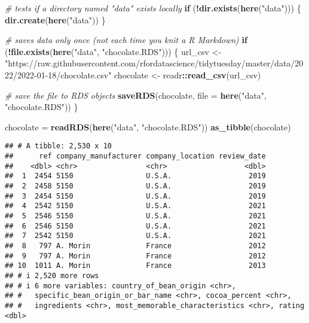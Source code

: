 \documentclass[
]{article}
\newenvironment{Shaded}{\begin{snugshade}}{\end{snugshade}}
\newcommand{\AttributeTok}[1]{\textcolor[rgb]{0.13,0.29,0.53}{#1}}
\newcommand{\CommentTok}[1]{\textcolor[rgb]{0.56,0.35,0.01}{\textit{#1}}}
\newcommand{\ControlFlowTok}[1]{\textcolor[rgb]{0.13,0.29,0.53}{\textbf{#1}}}
\newcommand{\FunctionTok}[1]{\textcolor[rgb]{0.13,0.29,0.53}{\textbf{#1}}}
\newcommand{\NormalTok}[1]{#1}
\newcommand{\OtherTok}[1]{\textcolor[rgb]{0.56,0.35,0.01}{#1}}
\newcommand{\SpecialCharTok}[1]{\textcolor[rgb]{0.81,0.36,0.00}{\textbf{#1}}}
\newcommand{\StringTok}[1]{\textcolor[rgb]{0.31,0.60,0.02}{#1}}
\begin{document}
\begin{Shaded}
\begin{Highlighting}[]
\CommentTok{\# tests if a directory named "data" exists locally}
\ControlFlowTok{if}\NormalTok{ (}\SpecialCharTok{!}\FunctionTok{dir.exists}\NormalTok{(}\FunctionTok{here}\NormalTok{(}\StringTok{"data"}\NormalTok{))) \{}
    \FunctionTok{dir.create}\NormalTok{(}\FunctionTok{here}\NormalTok{(}\StringTok{"data"}\NormalTok{))}
\NormalTok{\}}

\CommentTok{\# saves data only once (not each time you knit a R Markdown)}
\ControlFlowTok{if}\NormalTok{ (}\SpecialCharTok{!}\FunctionTok{file.exists}\NormalTok{(}\FunctionTok{here}\NormalTok{(}\StringTok{"data"}\NormalTok{, }\StringTok{"chocolate.RDS"}\NormalTok{))) \{}
\NormalTok{    url\_csv }\OtherTok{\textless{}{-}} \StringTok{"https://raw.githubusercontent.com/rfordatascience/tidytuesday/master/data/2022/2022{-}01{-}18/chocolate.csv"}
\NormalTok{    chocolate }\OtherTok{\textless{}{-}}\NormalTok{ readr}\SpecialCharTok{::}\FunctionTok{read\_csv}\NormalTok{(url\_csv)}

    \CommentTok{\# save the file to RDS objects}
    \FunctionTok{saveRDS}\NormalTok{(chocolate, }\AttributeTok{file =} \FunctionTok{here}\NormalTok{(}\StringTok{"data"}\NormalTok{, }\StringTok{"chocolate.RDS"}\NormalTok{))}
\NormalTok{\}}
\end{Highlighting}
\end{Shaded}

\begin{Shaded}
\begin{Highlighting}[]
\NormalTok{chocolate }\OtherTok{=} \FunctionTok{readRDS}\NormalTok{(}\FunctionTok{here}\NormalTok{(}\StringTok{"data"}\NormalTok{, }\StringTok{"chocolate.RDS"}\NormalTok{))}
\FunctionTok{as\_tibble}\NormalTok{(chocolate)}
\end{Highlighting}
\end{Shaded}

\begin{verbatim}
## # A tibble: 2,530 x 10
##      ref company_manufacturer company_location review_date
##    <dbl> <chr>                <chr>                  <dbl>
##  1  2454 5150                 U.S.A.                  2019
##  2  2458 5150                 U.S.A.                  2019
##  3  2454 5150                 U.S.A.                  2019
##  4  2542 5150                 U.S.A.                  2021
##  5  2546 5150                 U.S.A.                  2021
##  6  2546 5150                 U.S.A.                  2021
##  7  2542 5150                 U.S.A.                  2021
##  8   797 A. Morin             France                  2012
##  9   797 A. Morin             France                  2012
## 10  1011 A. Morin             France                  2013
## # i 2,520 more rows
## # i 6 more variables: country_of_bean_origin <chr>,
## #   specific_bean_origin_or_bar_name <chr>, cocoa_percent <chr>,
## #   ingredients <chr>, most_memorable_characteristics <chr>, rating <dbl>
\end{verbatim}
\end{document}
